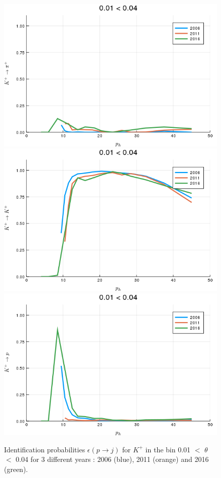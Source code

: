 \begin{figure}[!p]
  \centering
	\includegraphics[scale=0.35]{./gfx/t1/kp2pip.png}
  \includegraphics[scale=0.35]{./gfx/t1/kp2kp.png}
  \includegraphics[scale=0.35]{./gfx/t1/kp2pp.png}
	\caption{Identification probabilities $\epsilon(p \rightarrow j)$ for $K^+$ in the bin 0.01 $<$ $\theta$ $<$ 0.04 for 3 different years : 2006 (blue), 2011 (orange) and 2016 (green).}
	\label{pic:compkp}
\end{figure}

